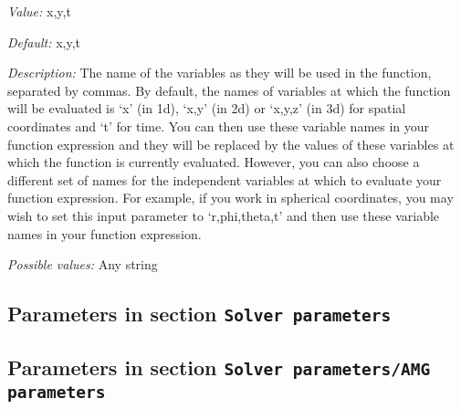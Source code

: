 \begin{itemize}
{\it Value:} x,y,t


{\it Default:} x,y,t


{\it Description:} The name of the variables as they will be used in the function, separated by commas. By default, the names of variables at which the function will be evaluated is `x' (in 1d), `x,y' (in 2d) or `x,y,z' (in 3d) for spatial coordinates and `t' for time. You can then use these variable names in your function expression and they will be replaced by the values of these variables at which the function is currently evaluated. However, you can also choose a different set of names for the independent variables at which to evaluate your function expression. For example, if you work in spherical coordinates, you may wish to set this input parameter to `r,phi,theta,t' and then use these variable names in your function expression.


{\it Possible values:} Any string
\end{itemize}

\subsection{Parameters in section \tt Solver parameters}
\label{parameters:Solver_20parameters}


\subsection{Parameters in section \tt Solver parameters/AMG parameters}
\label{parameters:Solver_20parameters/AMG_20parameters}

